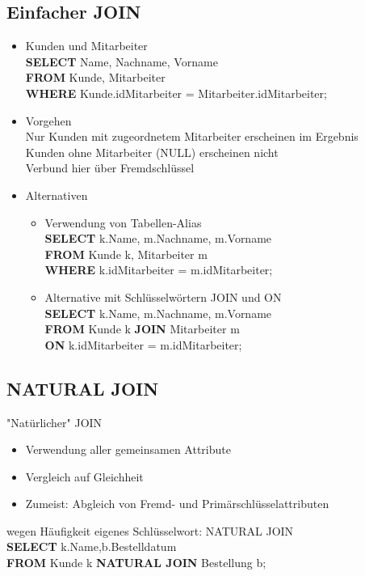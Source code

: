 \documentclass{scrreprt}
\begin{document}
\subsection{Einfacher JOIN}
\begin{itemize}
  \item Kunden und Mitarbeiter
  \\\textbf{SELECT} Name, Nachname, Vorname
  \\\textbf{FROM} Kunde, Mitarbeiter
  \\\textbf{WHERE} Kunde.idMitarbeiter = Mitarbeiter.idMitarbeiter;
  \item Vorgehen
  \\Nur Kunden mit zugeordnetem Mitarbeiter erscheinen im Ergebnis
  \\Kunden ohne Mitarbeiter (NULL) erscheinen nicht
  \\Verbund hier über Fremdschlüssel
  \item Alternativen
  \begin{itemize}
    \item Verwendung von Tabellen-Alias
    \\\textbf{SELECT} k.Name, m.Nachname, m.Vorname
    \\\textbf{FROM} Kunde k, Mitarbeiter m
    \\\textbf{WHERE} k.idMitarbeiter = m.idMitarbeiter;
    \item Alternative mit Schlüsselwörtern JOIN und ON
    \\\textbf{SELECT} k.Name, m.Nachname, m.Vorname
    \\\textbf{FROM} Kunde k \textbf{JOIN} Mitarbeiter m
    \\\textbf{ON} k.idMitarbeiter = m.idMitarbeiter;
  \end{itemize}
\end{itemize}
\subsection{NATURAL JOIN}
"Natürlicher" JOIN
\begin{itemize}
  \item Verwendung aller gemeinsamen Attribute
  \item Vergleich auf Gleichheit
  \item Zumeist: Abgleich von Fremd- und Primärschlüsselattributen
\end{itemize}
wegen Häufigkeit eigenes Schlüsselwort: NATURAL JOIN
\\\textbf{SELECT} k.Name,b.Bestelldatum
\\\textbf{FROM} Kunde k \textbf{NATURAL JOIN} Bestellung b;
\end{document}
